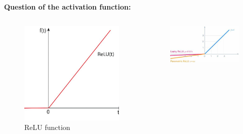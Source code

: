 \documentclass{beamer}
\begin{document}
\begin{frame}
\begin{center}
\textbf{Question of the activation function:} 
\end{center}

  \begin{columns}
    \begin{column}{0.25\textwidth}
      \begin{figure}
        \centering
        \includegraphics[width=\textwidth]{relu.jpg}
        \caption{ReLU function}
      \end{figure}
    \end{column}
    \begin{column}{0.33\textwidth}
      \begin{figure}
        \centering
        \includegraphics[width=\textwidth]{lrelu.jpeg}

\end{figure}
\end{column}
\end{columns}
\end{frame}
\end{document}

